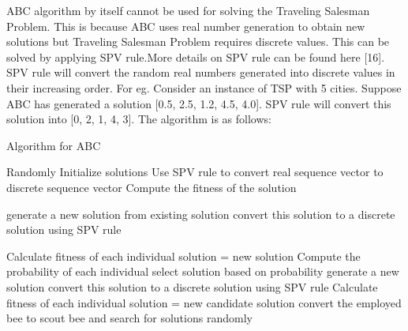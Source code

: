 \documentclass[conference]{IEEEtran}
\begin{document}
ABC algorithm by itself cannot be used for solving the Traveling Salesman Problem. This is because ABC uses real number generation to obtain new solutions but Traveling Salesman Problem requires discrete values. This can be solved by applying SPV rule.More details on SPV rule can be found here [16]. SPV rule will convert the random real numbers generated into discrete values in their increasing order. For eg. Consider an instance of TSP with 5 cities. Suppose ABC has generated  a solution [0.5, 2.5, 1.2, 4.5, 4.0]. SPV rule will convert this solution into [0, 2, 1, 4, 3].  The algorithm is as follows:


\begin{algorithm}[H]
\caption{Algorithm for ABC}
\begin{algorithmic}[1]
\STATE Randomly Initialize solutions
\STATE Use SPV rule to convert real sequence vector to discrete sequence vector
\ENDFOR 
\STATE Compute the fitness of the solution
\ENDFOR 

\REPEAT
{}

\STATE generate a new solution from existing solution
\STATE convert this solution to a discrete solution using SPV rule
\ENDFOR 


\STATE Calculate fitness of each individual
\STATE solution = new solution
\ENDIF
\ENDFOR
\STATE Compute the probability of each individual
\STATE select solution based on probability
\STATE generate a new solution
\STATE convert this solution to a discrete solution using SPV rule
\ENDFOR
\STATE Calculate fitness of each individual
\STATE solution = new candidate solution
\ENDIF
\ENDFOR
{}
\STATE convert the employed bee to scout bee and search for solutions randomly
\ENDIF

\end{algorithmic}
\end{algorithm}
\end{document}
